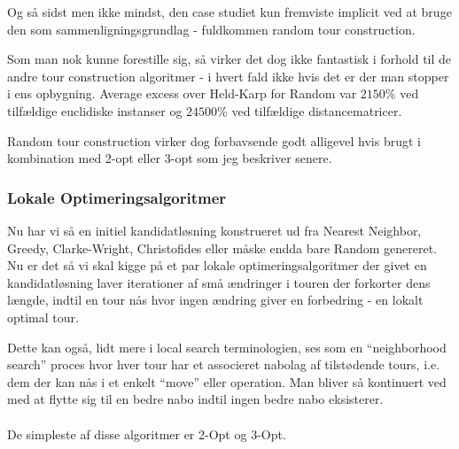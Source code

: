 Og så sidst men ikke mindst, den case studiet kun fremviste implicit ved at bruge den som sammenligningsgrundlag - fuldkommen random tour construction.

Som man nok kunne forestille sig, så virker det dog ikke fantastisk i forhold til de andre tour construction algoritmer - i hvert fald ikke hvis det er der man stopper i ens opbygning. Average excess over Held-Karp for Random var $2150\%$ ved tilfældige euclidiske instanser og $24500\%$ ved tilfældige distancematricer. 

Random tour construction virker dog forbavsende godt alligevel hvis brugt i kombination med 2-opt eller 3-opt som jeg beskriver senere.


\subsubsection{Lokale Optimeringsalgoritmer}

Nu har vi så en initiel kandidatløsning konstrueret ud fra Nearest Neighbor, Greedy, Clarke-Wright, Christofides eller måske endda bare Random genereret. Nu er det så vi skal kigge på et par lokale optimeringsalgoritmer der givet en kandidatløsning laver iterationer af små ændringer i touren der forkorter dens længde, indtil en tour nås hvor ingen ændring giver en forbedring - en lokalt optimal tour. 

Dette kan også, lidt mere i local search terminologien, ses som en ``neighborhood search'' proces hvor hver tour har et associeret nabolag af tilstødende tours, i.e. dem der kan nås i et enkelt ``move'' eller operation. Man bliver så kontinuert ved med at flytte sig til en bedre nabo indtil ingen bedre nabo eksisterer.\\
~\\
De simpleste af disse algoritmer er 2-Opt og 3-Opt.\\

